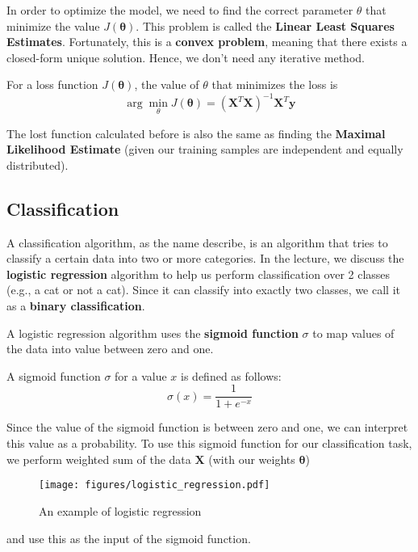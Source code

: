 \documentclass[10pt]{article}
\begin{document}
In order to optimize the model, we need to find the correct parameter $\theta$ 
that minimize the value $J(\pmb\theta)$. This problem is called the \textbf{Linear 
Least Squares Estimates}. Fortunately, this is a \textbf{convex 
problem}, meaning that there exists a closed-form unique solution. Hence,
we don't need any iterative method.

\begin{definition}
    For a loss function $J(\pmb\theta)$, the value of $\theta$ that minimizes
    the loss is 
    \begin{equation*}
        \arg\min_\theta J(\pmb\theta) = (\mathbf{X}^T\mathbf{X})^{-1}\mathbf{X}^T\mathbf{y} 
    \end{equation*} 
\end{definition}

The lost function calculated before is also the same as finding the
\textbf{Maximal Likelihood Estimate} (given our training samples are independent
and equally distributed).

\subsection{Classification}

A classification algorithm, as the name describe, is an algorithm that 
tries to classify a certain data into two or more categories. In the lecture,
we discuss the \textbf{logistic regression}
algorithm to help us
perform classification over 2 classes (e.g., a cat or not a cat). 
Since it can classify into exactly two classes, we call it as 
a \textbf{binary classification}.

A logistic regression algorithm uses the \textbf{sigmoid function} $\sigma$ 
to map values of the data into value between zero and one. 

\begin{definition}
    A sigmoid function $\sigma$ for a value $x$ is defined as follows:
    \begin{equation*}
        \sigma(x) = \frac{1}{1 + e^{-x}}
    \end{equation*}
\end{definition}

Since the value of the sigmoid function is between zero and one, we can 
interpret this value as a probability. To use this sigmoid function 
for our classification task, we perform weighted sum of the 
data $\mathbf{X}$ (with our weights $\pmb{\theta}$)
\begin{marginfigure}
    \begin{figure}[H]
        \texttt{[image: figures/logistic\_regression.pdf]}
        \caption{An example of logistic regression}
    \end{figure}
\end{marginfigure}
and use this 
as the input of the sigmoid function.
\end{document}
